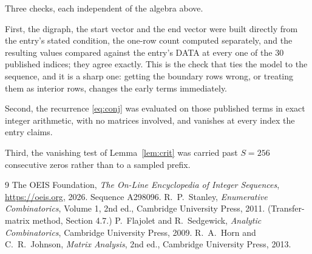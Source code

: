 \documentclass[11pt,a4paper]{article}
\theoremstyle{plain}
\theoremstyle{definition}
\begin{document}
Three checks, each independent of the algebra above.

First, the digraph, the start vector and the end vector were built directly from the
entry's stated condition, the one-row count computed separately, and the resulting values
compared against the entry's DATA at every one of the $30$ published indices; they
agree exactly. This is the check that ties the model to the sequence, and it is a sharp one:
getting the boundary rows wrong, or treating them as interior rows, changes the early terms
immediately.

Second, the recurrence \eqref{eq:conj} was evaluated on those published terms in exact
integer arithmetic, with no matrices involved, and vanishes at every index the entry claims.

Third, the vanishing test of Lemma~\ref{lem:crit} was carried past $S=256$ consecutive
zeros rather than to a sampled prefix.

\begin{thebibliography}{9}
 The OEIS Foundation, \emph{The On-Line Encyclopedia of Integer
Sequences}, \url{https://oeis.org}, 2026. Sequence A298096.
 R.~P.~Stanley, \emph{Enumerative Combinatorics}, Volume 1, 2nd ed.,
Cambridge University Press, 2011. (Transfer-matrix method, Section 4.7.)
 P.~Flajolet and R.~Sedgewick, \emph{Analytic Combinatorics}, Cambridge
University Press, 2009.
 R.~A.~Horn and C.~R.~Johnson, \emph{Matrix Analysis}, 2nd ed., Cambridge
University Press, 2013.
\end{thebibliography}
\end{document}
